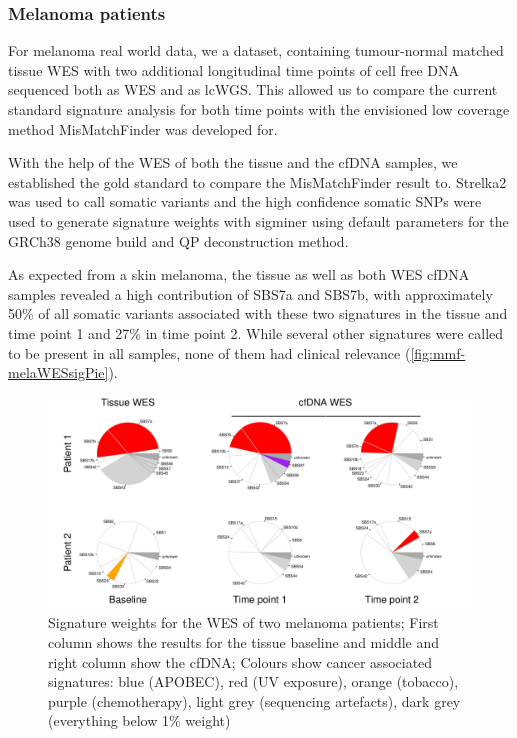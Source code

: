 \subsubsection{Melanoma patients}
\label{mmf-sec:melpatients}

For melanoma real world data, we a dataset, containing tumour-normal matched tissue WES with two additional longitudinal time points of cell free DNA sequenced both as WES and as lcWGS. This allowed us to compare the current standard signature analysis for both time points with the envisioned low coverage method MisMatchFinder was developed for.

With the help of the WES of both the tissue and the cfDNA samples, we established the gold standard to compare the MisMatchFinder result to.  Strelka2 was used to call somatic variants and the high confidence somatic SNPs were used to generate signature weights with sigminer \cite{Wang2021} using default parameters for the GRCh38 genome build and QP deconstruction method.

As expected from a skin melanoma, the tissue as well as both WES cfDNA samples revealed a high contribution of SBS7a and SBS7b, with approximately 50\%  of all somatic variants associated with these two signatures in the tissue and time point 1 and 27\% in time point 2. While several other signatures were called to be present in all samples, none of them had clinical relevance (\autoref{fig:mmf-melaWESsigPie}).

\begin{figure}[ht]
\centering
\includegraphics[width=.99\linewidth]{Figures/MisMatchFinder/melanomaWESsignatures.pdf}
\caption[Signature weights for the WES of two melanoma patients]{Signature weights for the WES of two melanoma patients; First column shows the results for the tissue baseline and middle and right column show the cfDNA; Colours show cancer associated signatures: blue (APOBEC), red (UV exposure), orange (tobacco), purple (chemotherapy), light grey (sequencing artefacts), dark grey (everything below 1\% weight)}\label{fig:mmf-melaWESsigPie}
\end{figure}
 

